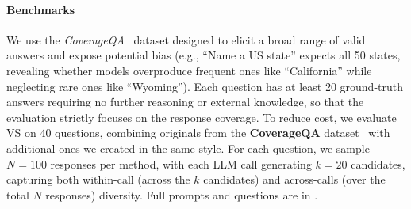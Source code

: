 \begin{figure}
    \label{tab:bias_coverage_test}
    \vspace{-2em}
\end{figure}

\paragraph{Benchmarks} We use the \textit{CoverageQA}~\citep{wong2024simplestratdiversifyinglanguagemodel} dataset designed to elicit a broad range of valid answers and expose potential bias (e.g., ``Name a US state''   expects all 50 states, revealing whether models overproduce frequent ones like ``California'' while neglecting rare ones like ``Wyoming''). 
Each question has at least 20 ground-truth answers requiring no further reasoning or external knowledge, so that the evaluation strictly focuses on the response coverage. 
To reduce cost, we evaluate VS on 40 questions, combining originals from the \textbf{CoverageQA} dataset~\citep{wong2024simplestratdiversifyinglanguagemodel} with additional ones we created in the same style.  
For each question, we sample $N=100$ responses per method, with each LLM call generating $k=20$ candidates, capturing both within-call (across the $k$ candidates) and across-calls (over the total $N$ responses) diversity.
Full prompts and questions are in .

